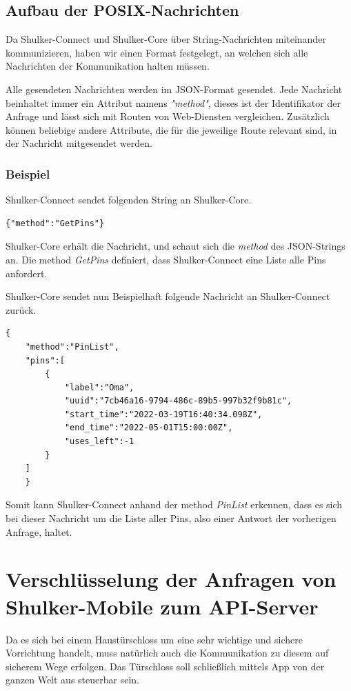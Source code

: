 \subsection{Aufbau der POSIX-Nachrichten}
Da Shulker-Connect und Shulker-Core über String-Nachrichten miteinander kommunizieren, haben wir einen
Format festgelegt, an welchen sich alle Nachrichten der Kommunikation halten müssen.


Alle gesendeten Nachrichten werden im JSON-Format gesendet. Jede Nachricht beinhaltet immer ein Attribut namens
\textit{"method"}, dieses ist der Identifikator der Anfrage und lässt sich mit Routen von Web-Diensten vergleichen.
Zusätzlich können beliebige andere Attribute, die für die jeweilige Route relevant sind, in der Nachricht mitgesendet werden.

\subsubsection{Beispiel}
Shulker-Connect sendet folgenden String an Shulker-Core.
\begin{lstlisting}
{"method":"GetPins"}
\end{lstlisting}
Shulker-Core erhält die Nachricht, und schaut sich die \textit{method} des JSON-Strings an.
Die method \textit{GetPins} definiert, dass Shulker-Connect eine Liste alle Pins anfordert.

Shulker-Core sendet nun Beispielhaft folgende Nachricht an Shulker-Connect zurück.
\begin{lstlisting}
{
    "method":"PinList",
    "pins":[
        {
            "label":"Oma",
            "uuid":"7cb46a16-9794-486c-89b5-997b32f9b81c",
            "start_time":"2022-03-19T16:40:34.098Z",
            "end_time":"2022-05-01T15:00:00Z",
            "uses_left":-1
        }
    ]
    }
\end{lstlisting}
Somit kann Shulker-Connect anhand der method \textit{PinList} erkennen, dass es sich bei dieser Nachricht um die Liste
aller Pins, also einer Antwort der vorherigen Anfrage, haltet.

\section{Verschlüsselung der Anfragen von Shulker-Mobile zum API-Server}
Da es sich bei einem Haustürschloss um eine sehr wichtige und sichere Vorrichtung handelt, muss natürlich auch die
Kommunikation zu diesem auf sicherem Wege erfolgen. Das Türschloss soll schließlich mittels App von der ganzen Welt
aus steuerbar sein.

